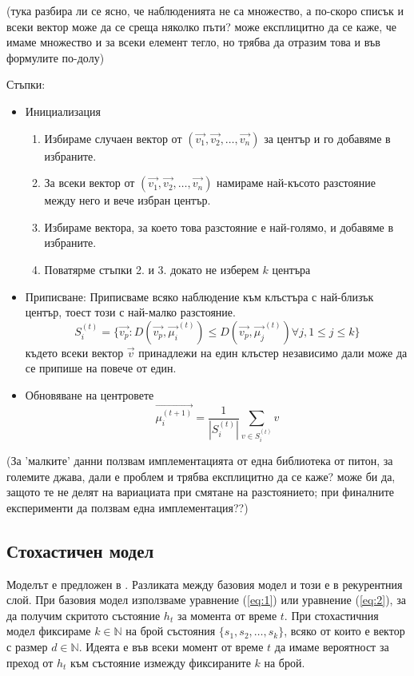 \documentclass[a4paper,12pt]{article}
\begin{document}
(тука разбира ли се ясно, че наблюденията не са множество, а по-скоро списък и всеки вектор може да се среща няколко пъти? може експлицитно да се каже, че имаме множество и за всеки елемент тегло, но трябва да отразим това и във формулите по-долу)

Стъпки:
\begin{itemize}
\item Инициализация
    \begin{enumerate}
    \item Избираме случаен вектор от $(\vec{v_1}, \vec{v_2},\ldots, \vec{v_n})$ за център и го добавяме в избраните.
    \item За всеки вектор от $(\vec{v_1}, \vec{v_2},\ldots, \vec{v_n})$ намираме най-късото разстояние между него и вече избран център.
    \item Избираме вектора, за което това разстояние е най-голямо, и добавяме в избраните.
    \item Поватярме стъпки 2. и 3. докато не изберем $k$ центъра
    \end{enumerate}
\item Приписване:
Приписваме всяко наблюдение към клъстъра с най-близък център, тоест този с най-малко разстояние.
\begin{equation}
S_i^{(t)} = \{\vec{v_p}: D(\vec{v_p}, {\vec{\mu_i}}^{(t)}) \leq D(\vec{v_p}, {\vec{\mu_j}}^{(t)}) \forall j, 1 \leq j \leq k\}
\end{equation}
където всеки вектор $\vec{v}$ принадлежи на един клъстер независимо дали може да се припише на повече от един.
\item Обновяване на центровете
\begin{equation}
\vec{\mu_i^{(t+1)}} = \frac{1}{|S_i^{(t)}|} \sum_{v \in S_i^{(t)}}{v}
\end{equation}
\end{itemize}

(За 'малките' данни ползвам имплементацията от една библиотека от питон, за големите джава, дали е проблем и трябва експлицитно да се каже? може би да, защото те не делят на вариациата при смятане на разстоянието; при финалните експерименти да ползвам една имплементация??)

\subsection{Стохастичен модел}

Моделът е предложен в \cite{citation06}. Разликата между базовия модел и този е в рекурентния слой. При базовия модел използваме уравнение (\ref{eq:1}) или уравнение (\ref{eq:2}), за да получим скритото състояние $h_t$ за момента от време $t$. При стохастичния модел фиксираме $k \in \mathbb{N}$ на брой състояния $\{s_1, s_2, \ldots, s_k\}$, всяко от които е вектор с размер $d \in \mathbb{N}$. Идеята е във всеки момент от време $t$ да имаме вероятност за преход от $h_t$ към състояние измежду фиксираните $k$ на брой. 
\end{document}
